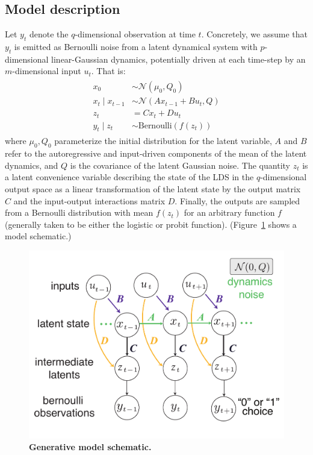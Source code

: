 \subsection{Model description}
\label{sec:bestlds:theory:model}

Let $y_t$ denote the $q$-dimensional observation at time $t$. Concretely, we assume that $y_t$ is emitted as Bernoulli noise from a latent dynamical system with $p$-dimensional linear-Gaussian dynamics, potentially driven at each time-step by an $m$-dimensional input $u_t$. That is:
\begin{align}
\begin{split}
    x_0 &\sim \mathcal{N}(\mu_0, Q_0) \\
    x_t \mid x_{t-1} &\sim \mathcal{N}(Ax_{t-1} + Bu_t, Q) \\
    z_t &= Cx_t + Du_t \\
    y_t \mid z_t &\sim \textrm{Bernoulli}(f(z_t))
\label{generative_model}
\end{split}
\end{align}
\noindent where $\mu_0, Q_0$ parameterize the initial distribution for the latent variable, $A$ and $B$ refer to the autoregressive and input-driven components of the mean of the latent dynamics, and $Q$ is the covariance of the latent Gaussian noise. The quantity $z_t$ is a latent convenience variable describing the state of the LDS in the $q$-dimensional output space as a linear transformation of the latent state by the output matrix $C$ and the input-output interactions matrix $D$. Finally, the outputs are sampled from a Bernoulli distribution with mean $f(z_t)$ for an arbitrary function $f$ (generally taken to be either the logistic or probit function). (Figure~\ref{fig:bestlds:1} shows a model schematic.)
\begin{figure}[t!]
\centering
    \includegraphics[width=0.65\linewidth]{ch4-bestlds/bestlds-figures/fig1.pdf}
    \caption[Generative model schematic]{\textbf{Generative model schematic.}}
    \label{fig:bestlds:1}
\end{figure}